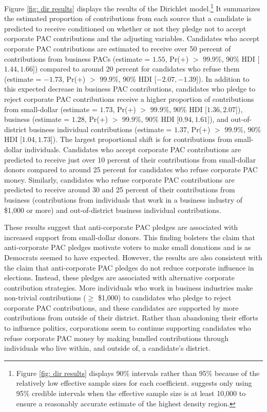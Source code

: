 \documentclass[12pt]{article}
\begin{document}
Figure \ref{fig: dir results} displays the results of the Dirichlet model.\footnote{Figure \ref{fig: dir results} displays 90\% intervals rather than 95\% because of the relatively low effective sample sizes for each coefficient. \citet{kruschke2014} suggests only using 95\% credible intervals when the effective sample size is at least 10,000 to ensure a reasonably accurate estimate of the highest density region.} It summarizes the estimated proportion of contributions from each source that a candidate is predicted to receive conditioned on whether or not they pledge not to accept corporate PAC contributions and the adjusting variables. Candidates who accept corporate PAC contributions are estimated to receive over 50 percent of contributions from business PACs (estimate = $1.55$, Pr(+) $>$ 99.9\%, 90\% HDI [$1.44, 1.66$]) compared to around 20 percent for candidates who refuse them (estimate = $-1.73$, Pr(+) $>$ 99.9\%, 90\% HDI [$-2.07, -1.39$]). In addition to this expected decrease in business PAC contributions, candidates who pledge to reject corporate PAC contributions receive a higher proportion of contributions from small-dollar (estimate = $1.73$, Pr(+) $>$ 99.9\%, 90\% HDI [$1.36, 2.07$]), business (estimate = $1.28$, Pr(+) $>$ 99.9\%, 90\% HDI [$0.94, 1.61$]), and out-of-district business individual contributions (estimate = $1.37$, Pr(+) $>$ 99.9\%, 90\% HDI [$1.04, 1.73$]). The largest proportional shift is for contributions from small-dollar individuals. Candidates who accept corporate PAC contributions are predicted to receive just over 10 percent of their contributions from small-dollar donors compared to around 25 percent for candidates who refuse corporate PAC money. Similarly, candidates who refuse corporate PAC contributions are predicted to receive around 30 and 25 percent of their contributions from business (contributions from individuals that work in a business industry of \$1,000 or more) and out-of-district business individual contributions. 

These results suggest that anti-corporate PAC pledges are associated with increased support from small-dollar donors. This finding bolsters the claim that anti-corporate PAC pledges motivate voters to make small donations and is as Democrats seemed to have expected. However, the results are also consistent with the claim that anti-corporate PAC pledges do not reduce corporate influence in elections. Instead, these pledges are associated with alternative corporate contribution strategies. More individuals who work in business industries make non-trivial contributions ($\geq$ \$1,000) to candidates who pledge to reject corporate PAC contributions, and these candidates are supported by more contributions from outside of their district. Rather than abandoning their efforts to influence politics, corporations seem to continue supporting candidates who refuse corporate PAC money by making bundled contributions through individuals who live within, and outside of, a candidate's district.
\end{document}
